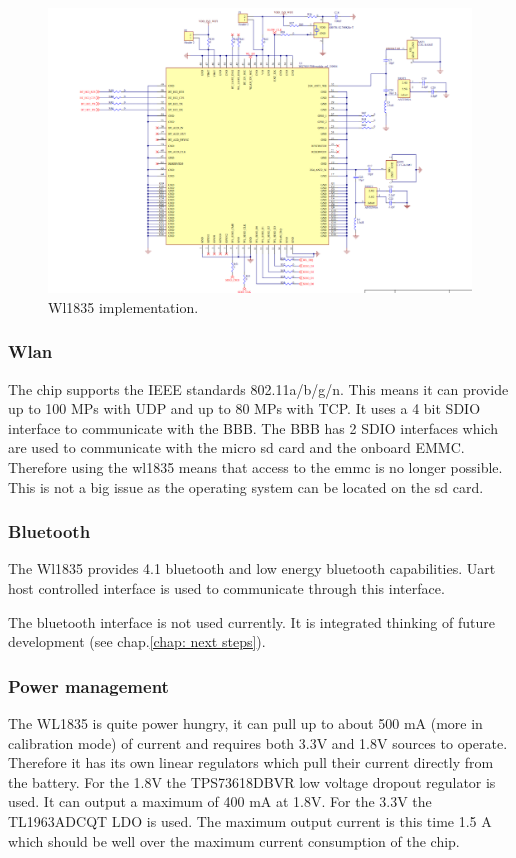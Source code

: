 \begin{figure}[!htb]
    \centering
    \includegraphics[width=1\textwidth,keepaspectratio]{chap/hardFig/wl1835_chip_sch}
    \caption{Wl1835 implementation.}
    \label{fig:wl1835 chip}
\end{figure}

\subsubsection{Wlan}
The chip supports the IEEE standards 802.11a/b/g/n. This means it can provide up to 100 MPs with UDP and up to 80 MPs with TCP.
It uses a 4 bit SDIO interface to communicate with the BBB. The BBB has 2 SDIO interfaces which are used to communicate with the micro sd card and the onboard EMMC. Therefore using the wl1835 means that access to the emmc is no longer possible. This is not a big issue as the operating system can be located on the sd card.


\subsubsection{Bluetooth}
The Wl1835 provides 4.1 bluetooth and low energy bluetooth capabilities. Uart host controlled interface is used to communicate through this interface.

The bluetooth interface is not used currently. It is integrated thinking of future development (see chap.\ref{chap: next steps}).

\subsubsection{Power management}
The WL1835 is quite power hungry, it can pull up to about 500 mA (more in calibration mode) of current and requires both 3.3V and 1.8V sources to operate. Therefore it has its own linear regulators which pull their current directly from the battery. For the 1.8V the TPS73618DBVR low voltage dropout regulator is used. It can output a maximum of 400 mA at 1.8V. For the 3.3V the TL1963ADCQT LDO is used. The maximum output current is this time 1.5 A which should be well over the maximum current consumption of the chip.


